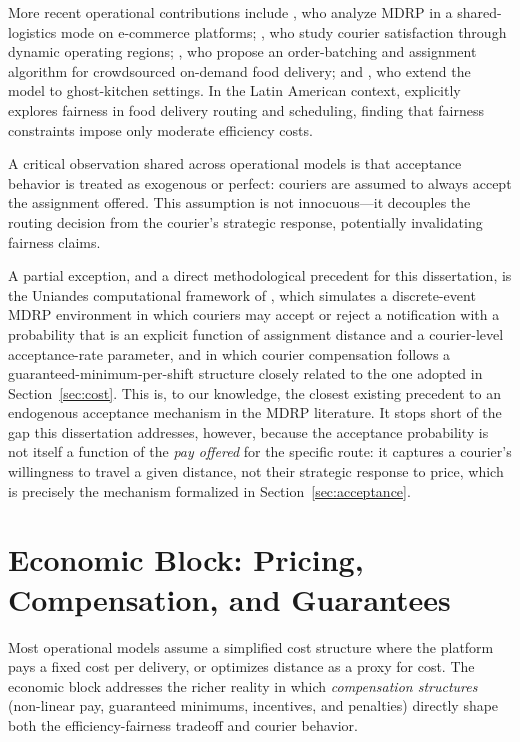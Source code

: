 \documentclass[12pt,a4paper]{report}
\begin{document}
More recent operational contributions include \citet{bi2023meal}, who analyze MDRP in a shared-logistics mode on e-commerce platforms; \citet{auad2023courier}, who study courier satisfaction through dynamic operating regions; \citet{simoni2023crowdsourced}, who propose an order-batching and assignment algorithm for crowdsourced on-demand food delivery; and \citet{neria2024restaurant}, who extend the model to ghost-kitchen settings. In the Latin American context, \citet{martinez2024exploring} explicitly explores fairness in food delivery routing and scheduling, finding that fairness constraints impose only moderate efficiency costs.

A critical observation shared across operational models is that acceptance behavior is treated as exogenous or perfect: couriers are assumed to always accept the assignment offered. This assumption is not innocuous---it decouples the routing decision from the courier's strategic response, potentially invalidating fairness claims.

A partial exception, and a direct methodological precedent for this dissertation, is the Uniandes computational framework of \citet{quintero2020computational}, which simulates a discrete-event MDRP environment in which couriers may accept or reject a notification with a probability that is an explicit function of assignment distance and a courier-level acceptance-rate parameter, and in which courier compensation follows a guaranteed-minimum-per-shift structure closely related to the one adopted in Section~\ref{sec:cost}. This is, to our knowledge, the closest existing precedent to an endogenous acceptance mechanism in the MDRP literature. It stops short of the gap this dissertation addresses, however, because the acceptance probability is not itself a function of the \emph{pay offered} for the specific route: it captures a courier's willingness to travel a given distance, not their strategic response to price, which is precisely the mechanism formalized in Section~\ref{sec:acceptance}.

\section{Economic Block: Pricing, Compensation, and Guarantees}
\label{sec:economic}

Most operational models assume a simplified cost structure where the platform pays a fixed cost per delivery, or optimizes distance as a proxy for cost. The economic block addresses the richer reality in which \emph{compensation structures} (non-linear pay, guaranteed minimums, incentives, and penalties) directly shape both the efficiency-fairness tradeoff and courier behavior.
\end{document}
